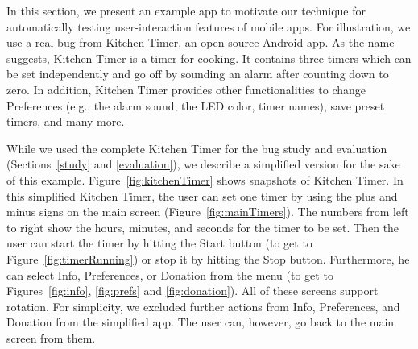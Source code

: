 \label{example}

In this section, we present an example app to motivate our technique for automatically testing %
user-interaction features of mobile apps. %
For illustration, %
we use a real bug from Kitchen Timer, an open source Android app. As the name suggests, Kitchen Timer is a timer for cooking. It contains three timers which can be set independently and go off by sounding an alarm after counting down to zero. In addition, Kitchen Timer provides other functionalities to change Preferences (e.g., the alarm sound, the LED color, timer names), save preset timers, and many more. 

While we used the complete Kitchen Timer for the bug study and evaluation (Sections~\ref{study} and \ref{evaluation}), we describe a simplified version for the sake of this example. Figure~\ref{fig:kitchenTimer} shows snapshots of Kitchen Timer. In this simplified Kitchen Timer, the user can set one timer by using the plus and minus signs on the main screen (Figure~\ref{fig:mainTimers}). The numbers from left to right show the hours, minutes, and seconds for the timer to be set. Then the user can start the timer by hitting the Start button (to get to Figure~\ref{fig:timerRunning}) or stop it by hitting the Stop button. Furthermore, he can select Info, Preferences, or Donation from the menu (to get to Figures~\ref{fig:info}, \ref{fig:prefs} and \ref{fig:donation}). All of these screens support rotation. For simplicity, we excluded further actions from Info, Preferences, and Donation from the simplified app. The user can, however, go back to the main screen from them.

